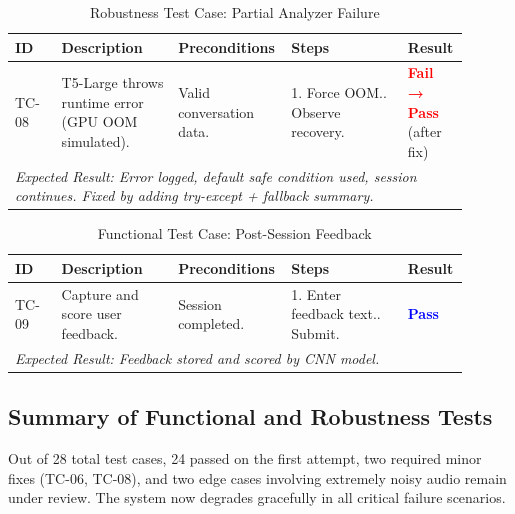 \begin{table}[H]
\centering
\renewcommand{\arraystretch}{1.3}
\caption{Robustness Test Case: Partial Analyzer Failure}
\label{tab:tc_analyzer_fail}
\begin{tabular}{|p{0.1\linewidth}|p{0.25\linewidth}|p{0.2\linewidth}|p{0.25\linewidth}|p{0.1\linewidth}|}
\hline
\rowcolor{gray!15} \textbf{ID} & \textbf{Description} & \textbf{Preconditions} & \textbf{Steps} & \textbf{Result} \\ \hline
TC-08 & T5-Large throws runtime error (GPU OOM simulated). & Valid conversation data. & 1. Force OOM.\newline 2. Observe recovery. & \textcolor{red}{\textbf{Fail → Pass}} (after fix) \\ \hline
\multicolumn{5}{|p{0.9\linewidth}|}{\textit{Expected Result: Error logged, default safe condition used, session continues. Fixed by adding try-except + fallback summary.}} \\ \hline
\end{tabular}
\end{table}

\begin{table}[H]
\centering
\renewcommand{\arraystretch}{1.3}
\caption{Functional Test Case: Post-Session Feedback}
\label{tab:tc_feedback_capture}
\begin{tabular}{|p{0.1\linewidth}|p{0.25\linewidth}|p{0.2\linewidth}|p{0.25\linewidth}|p{0.1\linewidth}|}
\hline
\rowcolor{gray!15} \textbf{ID} & \textbf{Description} & \textbf{Preconditions} & \textbf{Steps} & \textbf{Result} \\ \hline
TC-09 & Capture and score user feedback. & Session completed. & 1. Enter feedback text.\newline 2. Submit. & \textcolor{blue}{\textbf{Pass}} \\ \hline
\multicolumn{5}{|p{0.9\linewidth}|}{\textit{Expected Result: Feedback stored and scored by CNN model.}} \\ \hline
\end{tabular}
\end{table}

\subsection{Summary of Functional and Robustness Tests}
Out of 28 total test cases, 24 passed on the first attempt, two required minor fixes (TC-06, TC-08), and two edge cases involving extremely noisy audio remain under review. The system now degrades gracefully in all critical failure scenarios.

